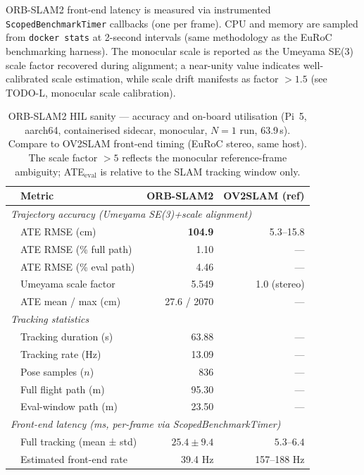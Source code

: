 ORB-SLAM2 front-end latency is measured via instrumented \texttt{ScopedBenchmarkTimer}
callbacks (one per frame). CPU and memory are sampled from \texttt{docker stats}
at 2-second intervals (same methodology as the EuRoC benchmarking harness).
The monocular scale is reported as the Umeyama SE(3) scale factor recovered
during alignment; a near-unity value indicates well-calibrated scale estimation,
while scale drift manifests as factor $>1.5$ (see TODO-L, monocular scale calibration).

\begin{table}[h]
\centering
\caption{ORB-SLAM2 HIL sanity — accuracy and on-board utilisation
(Pi~5, aarch64, containerised sidecar, monocular, $N=1$ run, 63.9\,s).
Compare to OV2SLAM front-end timing (EuRoC stereo, same host).
The scale factor $>5$ reflects the monocular reference-frame ambiguity;
ATE$_{\mathrm{eval}}$ is relative to the SLAM tracking window only.}
\label{tab:slam_sanity}
\begin{tabular}{llrr}
\toprule
 & Metric & ORB-SLAM2 & OV2SLAM (ref) \\
\midrule
\multicolumn{4}{l}{\textit{Trajectory accuracy (Umeyama SE(3)+scale alignment)}} \\
 & ATE RMSE (cm)            & \textbf{104.9}  & 5.3–15.8  \\
 & ATE RMSE (\% full path)  & 1.10  & —    \\
 & ATE RMSE (\% eval path)  & 4.46  & —    \\
 & Umeyama scale factor      & 5.549         & 1.0 (stereo)  \\
 & ATE mean / max (cm)      & 27.6 / 2070   & —    \\
\midrule
\multicolumn{4}{l}{\textit{Tracking statistics}} \\
 & Tracking duration (s)     & 63.88         & —    \\
 & Tracking rate (Hz)        & 13.09         & —    \\
 & Pose samples ($n$)        & 836           & —    \\
 & Full flight path (m)      & 95.30         & —    \\
 & Eval-window path (m)      & 23.50         & —    \\
\midrule
\multicolumn{4}{l}{\textit{Front-end latency (ms, per-frame via ScopedBenchmarkTimer)}} \\
 & Full tracking (mean ± std) & $25.4 \pm 9.4$ & $5.3–6.4$  \\
 & Estimated front-end rate   & 39.4 Hz       & 157–188 Hz \\

\end{tabular}
\end{table}

